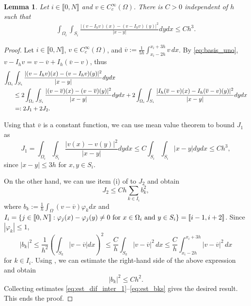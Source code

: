 \documentclass[11 pt]{article}
\newcommand\inter[1]{\llbracket #1\rrbracket}
\newtheorem{lemma}[theorem]{Lemma}
\numberwithin{equation}{section}
\begin{document}
\begin{lemma}\label{lem:stab_dif_interp}
Let $i\in\inter{0,N}$ and $v\in C_c^\infty(\Omega)$. There is $C>0$ independent of $h$ such that
\begin{align}\label{eq:approxim_estimate}
    \int_{\Omega_i}\int_{S_i}\frac{|(v-I_h v)(x)-(v-I_h v)(y)|^2}{|x-y|}dy dx \leq C h^3. 
\end{align}
\end{lemma}
%
\begin{proof}
Let $i\in\inter{0,N}$, $v\in C_c^\infty(\Omega)$, and $\overline {v}:=\frac{1}{5h}\int_{x_i-2h}^{x_i+3h}v\,dx$.
By \eqref{eq:basis_uno}, $v-I_h v=v-\overline{v}+I_h(\overline v - v)$, thus
%
\begin{align}\notag
    \int_{\Omega_i}&\int_{S_i}\frac{|(v-I_h v)(x)-(v-I_h v)(y)|^2}{|x-y|} dy dx \\ \notag
    &\leq 2\int_{\Omega_i}\int_{S_i}\frac{|(v-\overline{v})(x)-(v-\overline{v})(y)|^2}{|x-y|}dy dx + 2 \int_{\Omega_i}\int_{S_i}\frac{|I_h(\overline v-{v})(x)-I_h(\overline v-{v})(y)|^2}{|x-y|}dy dx \\ \label{eq:est_dif_inter_1}
    &=:2J_1+2J_2.
\end{align}
%

Using that $\overline v$ is a constant function, we can use mean value theorem to bound $J_1$ as
%
\begin{equation}\label{eq:est_J1}
    J_1 = \int_{\Omega_i}\int_{S_i}\frac{|v(x)-v(y)|^2}{|x-y|}dy dx \leq C \int_{S_i}\int_{S_i}|x-y|dy dx \leq Ch^3,
\end{equation}
since $|x-y|\leq 3h$ for $x,y\in S_i$.

On the other hand, we can use item (i) of  to $J_2$ and obtain
%
\begin{equation}\label{eq:est_J2}
    J_2 \leq Ch\sum_{k\in I_i} b_k^2,
\end{equation}
%
where $b_k:=\frac{1}{h}\int_{\Omega}(v-\overline v)\varphi_k dx$ and $I_i=\{j\in\inter{0,N}:\varphi_j(x)-\varphi_j(y) \neq 0 \ \textnormal{for $x\in \Omega_i$ and $y\in S_i$}\}=\inter{i-1,i+2}$. Since $|\varphi_k|\leq 1$, 
\begin{equation}\label{abk}
    |b_k|^2
    \leq \frac{1}{h^2}\left(\int_{S_k} |v-\overline v|dx\right)^2
    \leq \frac{C}{h}\int_{S_k}|v-\overline{v}|^2\, dx
    \leq \frac{C}{h}\int_{x_i-2h}^{x_i+3h}|v-\overline{v}|^2\, dx
\end{equation}
for $k\in I_i.$ Using , we can estimate the right-hand side of the above expression and obtain
%
\begin{equation}\label{eq:est_bks}
    |b_k|^2\leq Ch^2.
\end{equation}
%
Collecting estimates \eqref{eq:est_dif_inter_1}--\eqref{eq:est_bks} gives the desired result. This ends the proof. 
\end{proof}
\end{document}
